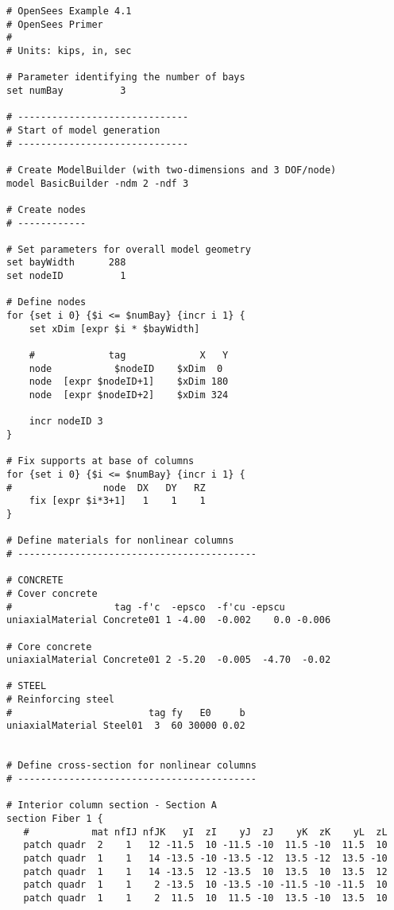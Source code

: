 \documentclass[12pt]{article}
\begin{document}
\vspace{0.2in} 
{\sf\small
\begin{verbatim}
# OpenSees Example 4.1
# OpenSees Primer
#
# Units: kips, in, sec

# Parameter identifying the number of bays
set numBay          3

# ------------------------------
# Start of model generation
# ------------------------------

# Create ModelBuilder (with two-dimensions and 3 DOF/node)
model BasicBuilder -ndm 2 -ndf 3

# Create nodes
# ------------

# Set parameters for overall model geometry
set bayWidth      288
set nodeID          1

# Define nodes
for {set i 0} {$i <= $numBay} {incr i 1} {
    set xDim [expr $i * $bayWidth]

    #             tag             X   Y
    node           $nodeID    $xDim  0
    node  [expr $nodeID+1]    $xDim 180
    node  [expr $nodeID+2]    $xDim 324

    incr nodeID 3
}

# Fix supports at base of columns
for {set i 0} {$i <= $numBay} {incr i 1} {
#                node  DX   DY   RZ
    fix [expr $i*3+1]   1    1    1
}

# Define materials for nonlinear columns
# ------------------------------------------

# CONCRETE
# Cover concrete
#                  tag -f'c  -epsco  -f'cu -epscu
uniaxialMaterial Concrete01 1 -4.00  -0.002    0.0 -0.006

# Core concrete
uniaxialMaterial Concrete01 2 -5.20  -0.005  -4.70  -0.02

# STEEL
# Reinforcing steel 
#                        tag fy   E0     b
uniaxialMaterial Steel01  3  60 30000 0.02


# Define cross-section for nonlinear columns
# ------------------------------------------

# Interior column section - Section A
section Fiber 1 {
   #           mat nfIJ nfJK   yI  zI    yJ  zJ    yK  zK    yL  zL
   patch quadr  2    1   12 -11.5  10 -11.5 -10  11.5 -10  11.5  10
   patch quadr  1    1   14 -13.5 -10 -13.5 -12  13.5 -12  13.5 -10
   patch quadr  1    1   14 -13.5  12 -13.5  10  13.5  10  13.5  12
   patch quadr  1    1    2 -13.5  10 -13.5 -10 -11.5 -10 -11.5  10
   patch quadr  1    1    2  11.5  10  11.5 -10  13.5 -10  13.5  10


\end{verbatim}}
\end{document}
